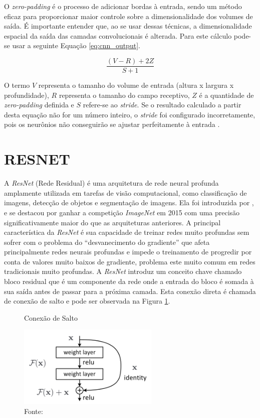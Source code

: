 O \textit{zero-padding} é o processo de adicionar bordas à entrada, sendo um método eficaz para proporcionar maior controle sobre a dimensionalidade dos volumes de saída. É importante entender que, ao se usar dessas técnicas, a dimensionalidade espacial da saída das camadas convolucionais é alterada. Para este cálculo pode-se usar a seguinte Equação \ref{eq:cnn_output}.

\begin{equation}
\frac{(V - R) + 2Z}{S + 1}
\label{eq:cnn_output}
\end{equation}

O termo $V$ representa o tamanho do volume de entrada (altura x largura x profundidade), $R$ representa o tamanho do campo receptivo, $Z$ é a quantidade de \textit{zero-padding} definida e $S$ refere-se ao \textit{stride}. Se o resultado calculado a partir desta equação não for um número inteiro, o \textit{stride} foi configurado incorretamente, pois os neurônios não conseguirão se ajustar perfeitamente à entrada \cite{osheaIntroductionConvolutionalNeural2015c}.

\section{RESNET}
\label{sec:resnet}

A \textit{ResNet} (Rede Residual) é uma arquitetura de rede neural profunda amplamente utilizada em tarefas de visão computacional, como classificação de imagens, detecção de objetos e segmentação de imagens. Ela foi introduzida por , e se destacou por ganhar a competição \textit{ImageNet} em 2015 com uma precisão significativamente maior do que as arquiteturas anteriores. A principal característica da \textit{ResNet} é sua capacidade de treinar redes muito profundas sem sofrer com o problema do ``desvanecimento do gradiente'' que afeta principalmente redes neurais profundas e impede o treinamento de progredir por conta de valores muito baixos de gradiente, problema este muito comum em redes tradicionais muito profundas. A \textit{ResNet} introduz um conceito chave chamado bloco residual que é um componente da rede onde a entrada do bloco é somada à sua saída antes de passar para a próxima camada. Esta conexão direta é chamada de conexão de salto e pode ser observada na Figura \ref{fig:fig013}.

\begin{figure}[h!]
    \centering
    \caption{Conexão de Salto}
    \includegraphics[width=0.6\textwidth]{figures/fig013.png}
    \caption*{Fonte: \cite{aiSelfAttentionBasedFusion2023}}
    \label{fig:fig013}
\end{figure}

